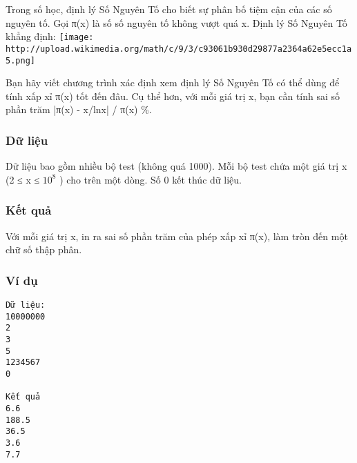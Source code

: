 



   Trong số học, định lý Số Nguyên Tố cho biết sự phân bố tiệm cận của các số nguyên tố. Gọi π(x) là số số nguyên tố không vượt quá x. Định lý Số Nguyên Tố khẳng định:  
\texttt{[image: http://upload.wikimedia.org/math/c/9/3/c93061b930d29877a2364a62e5ecc1a5.png]}

   Bạn hãy viết chương trình xác định xem định lý Số Nguyên Tố có thể dùng để tính xấp xỉ π(x) tốt đến đâu. Cụ thể hơn, với mỗi giá trị x, bạn cần tính sai số phần trăm |π(x) - x/lnx| / π(x) \%.  

\subsubsection{   Dữ liệu  }

   Dữ liệu bao gồm nhiều bộ test (không quá 1000). Mỗi bộ test chứa một giá trị x (2 ≤ x ≤ $10^{8}$   ) cho trên một dòng. Số 0 kết thúc dữ liệu.  

\subsubsection{   Kết quả  }

   Với mỗi giá trị x, in ra sai số phần trăm của phép xấp xỉ π(x), làm tròn đến một chữ số thập phân.  

\subsubsection{   Ví dụ  }
\begin{verbatim}
Dữ liệu:
10000000
2
3
5
1234567
0

Kết quả
6.6
188.5
36.5
3.6
7.7
\end{verbatim}
